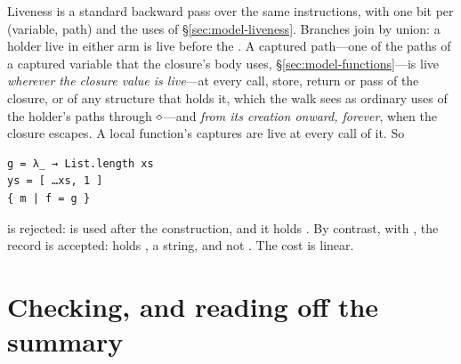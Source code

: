 Liveness is a standard backward pass over the same instructions, with one bit per (variable, path)
and the uses of \S\ref{sec:model-liveness}. Branches join by union: a holder live in either arm is
live before the . A captured path---one of the paths of a captured variable that the closure's body
uses, \S\ref{sec:model-functions}---is live \emph{wherever the closure value is live}---at
every call, store, return or pass of the closure, or of any structure that holds it, which the walk
sees as ordinary uses of the holder's paths through $\diamond$---and \emph{from its creation onward,
forever}, when the closure escapes. A local function's captures are live at every call of it. So
\begin{Verbatim}
g = λ_ → List.length xs
ys = [ …xs, 1 ]
{ m | f = g }
\end{Verbatim}
is rejected:  is used after the construction, and it holds . By contrast, with
, the record  is
accepted:  holds , a string, and not . The cost is linear.

\section{Checking, and reading off the summary}
\label{sec:inf-summarise}


